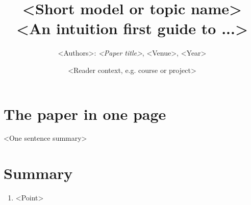 \documentclass[11pt,a4paper,oneside,open=any,titlepage=false,parskip=half]{scrreprt}
\title{<Short model or topic name>\\[0.3em]\Large <An intuition first guide to ...>}
\subtitle{<Authors>: \emph{<Paper title>}, <Venue>, <Year>}
\author{<Reader context, e.g. course or project>}
\date{}
\newenvironment{takeaway}{\begin{tcolorbox}[merk,title={Takeaway}]}{\end{tcolorbox}}
\begin{document}
\maketitle
\tableofcontents
\bigskip

\section{The paper in one page}

\begin{takeaway}
<One sentence summary>
\end{takeaway}


\section{Summary}
\begin{enumerate}[nosep]
  \item <Point>
\end{enumerate}
\end{document}
